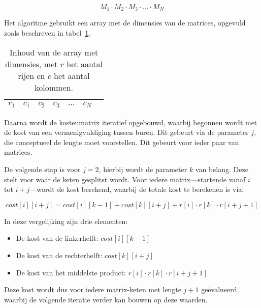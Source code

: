 \begin{equation}
    M_1 \cdot M_2 \cdot M_3 \cdot \ldots \cdot M_N
    \label{eq:matrix}
\end{equation}

Het algoritme gebruikt een array met de dimensies van de matrices, opgevuld zoals beschreven in tabel~\ref{table:dimensions}.

%
\begin{table}[!h]
    \centering
    \label{table:dimensions}
    \caption{Inhoud van de array met dimensies, met $r$ het aantal rijen en $c$ het aantal kolommen. }
    \begin{tabular}{|l|l|l|l|l|l|l|}
    \hline
    $r_1$ & $c_1$ & $c_2$ & $c_3$ & $\ldots$ & $c_N$ \\ \hline
    \end{tabular}
\end{table}
%

Daarna wordt de kostenmatrix iteratief opgebouwd, waarbij begonnen wordt met de kost van een vermenigvuldiging tussen buren. 
Dit gebeurt via de parameter $j$, die conceptueel de lengte moet voorstellen. 
Dit gebeurt voor ieder paar van matrices.

De volgende stap is voor $j = 2$, hierbij wordt de parameter $k$ van belang.
Deze stelt voor waar de keten gesplitst wordt. 
Voor iedere matrix---startende vanaf $i$ tot $i + j$---wordt de kost berekend, waarbij de totale kost te berekenen is via: 

\begin{equation}
    cost[i][i+j] = cost[i][k-1]+cost[k][i+j] + r[i] \cdot r[k] \cdot r[i+j+1]
\end{equation}

In deze vergelijking zijn drie elementen:

\begin{itemize}
    \item De kost van de linkerhelft: $cost[i][k-1]$
    \item De kost van de rechterhelft: $cost[k][i+j]$
    \item De kost van het middelste product: $r[i] \cdot r[k] \cdot r[i+j+1]$
\end{itemize}

Deze kost wordt dus voor iedere matrix-keten met lengte $j + 1$ ge\"evalueerd, waarbij de volgende iteratie verder kan bouwen op deze waarden. 


